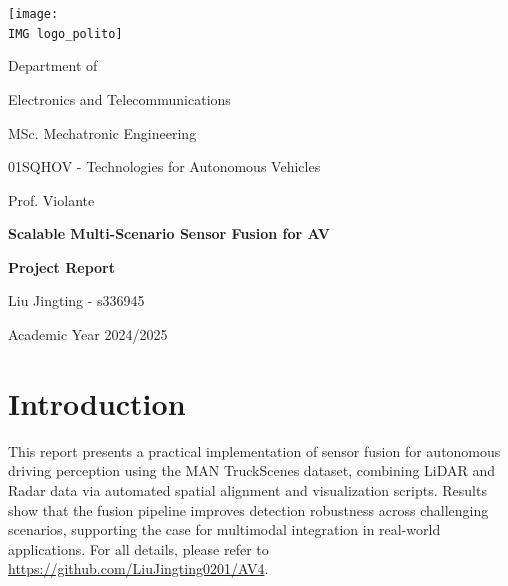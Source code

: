 \documentclass[10pt, a4paper, oneside]{article}
\newcommand{\IMG}{IMG/}
\begin{document}
	
	\thispagestyle{empty}
	
	\begin{titlepage}
		\begin{center}
			\texttt{[image: \\IMG logo\_polito]}
			
			\vspace{1cm}
			
			{\large Department of}
			
			\vspace{0.2cm}
			
			{\Large Electronics and Telecommunications}
			
			\vspace{0.2cm}
			
			{\large MSc. Mechatronic Engineering}
			
			\vfill
			
			{\large 01SQHOV - Technologies for Autonomous Vehicles}
			
			\vspace{0.2cm}
			
			{\large Prof. Violante}
			
			\vfill
			
			{\LARGE \textbf{Scalable Multi-Scenario Sensor Fusion for AV}}
			
			\vspace{0.2cm}
			
			{\large \textbf{Project Report}}
			\vspace{0.4cm}
			
			
			\vfill
			
			
			
			\vspace{0.2cm}
			
			
			Liu Jingting - s336945 
			
			\vfill
			
			{\large Academic Year 2024/2025}
		\end{center}
	\end{titlepage}
	
	\pagebreak
	
	

\section{Introduction}
This report presents a practical implementation of sensor fusion for autonomous driving perception using the MAN TruckScenes dataset, combining LiDAR and Radar data via automated spatial alignment and visualization scripts. Results show that the fusion pipeline improves detection robustness across challenging scenarios, supporting the case for multimodal integration in real-world applications.
For all details, please refer to \url{https://github.com/LiuJingting0201/AV4}.
\end{document}
